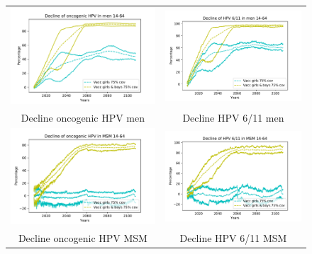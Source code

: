 \begin{figure}[!]
	\centering
	\begin{tabular}{cc}
		\includegraphics[width=0.5\linewidth]{IMGs/10.-Coste_efectividad/solo_muj_y_ambos/onco_hom.pdf}	& 
		\includegraphics[width=0.5\linewidth]{IMGs/10.-Coste_efectividad/solo_muj_y_ambos/verr_hom.pdf}  \\ 
		Decline oncogenic HPV men	& Decline HPV 6/11 men \\ 
		\includegraphics[width=0.5\linewidth]{IMGs/10.-Coste_efectividad/solo_muj_y_ambos/onco_MSM.pdf}	& 
		\includegraphics[width=0.5\linewidth]{IMGs/10.-Coste_efectividad/solo_muj_y_ambos/verr_MSM.pdf}  \\ 
		Decline oncogenic HPV MSM	& Decline HPV 6/11 MSM \\ 

\end{tabular}
\end{figure}
